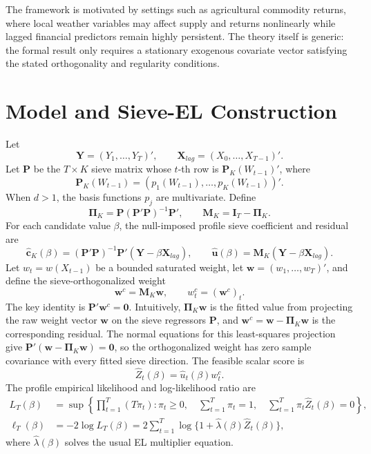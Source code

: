 \documentclass[11pt]{article}
\begin{document}
The framework is motivated by settings such as agricultural commodity returns, where local weather variables may affect supply and returns nonlinearly while lagged financial predictors remain highly persistent. The theory itself is generic: the formal result only requires a stationary exogenous covariate vector satisfying the stated orthogonality and regularity conditions.

\section{Model and Sieve-EL Construction}

Let
\[
    \bm Y=(Y_1,\ldots,Y_T)',\qquad
    \bm X_{lag}=(X_0,\ldots,X_{T-1})'.
\]
Let \(\bm P\) be the \(T\times K\) sieve matrix whose \(t\)-th row is \(\bm P_K(W_{t-1})'\), where
\[
    \bm P_K(W_{t-1})=(p_1(W_{t-1}),\ldots,p_K(W_{t-1}))'.
\]
When \(d>1\), the basis functions \(p_j\) are multivariate. Define
\[
    \bm\Pi_K=\bm P(\bm P'\bm P)^{-1}\bm P',
    \qquad
    \bm M_K=\bm I_T-\bm\Pi_K.
\]
For each candidate value \(\beta\), the null-imposed profile sieve coefficient and residual are
\begin{equation}
    \widehat{\bm c}_K(\beta)
    =(\bm P'\bm P)^{-1}\bm P'(\bm Y-\beta\bm X_{lag}),
    \qquad
    \widehat{\bm u}(\beta)=\bm M_K(\bm Y-\beta\bm X_{lag}).
    \label{eq:paper-profile-sieve}
\end{equation}
Let \(w_t=w(X_{t-1})\) be a bounded saturated weight, let \(\bm w=(w_1,\ldots,w_T)'\), and define the sieve-orthogonalized weight
\begin{equation}
    \bm w^c=\bm M_K\bm w,
    \qquad
    w_t^c=(\bm w^c)_t.
    \label{eq:paper-weight}
\end{equation}
The key identity is \(\bm P'\bm w^c=\bm0\). Intuitively, \(\bm\Pi_K\bm w\) is the fitted value from projecting the raw weight vector \(\bm w\) on the sieve regressors \(\bm P\), and \(\bm w^c=\bm w-\bm\Pi_K\bm w\) is the corresponding residual. The normal equations for this least-squares projection give \(\bm P'(\bm w-\bm\Pi_K\bm w)=\bm0\), so the orthogonalized weight has zero sample covariance with every fitted sieve direction. The feasible scalar score is
\begin{equation}
    \widehat Z_t(\beta)=\widehat u_t(\beta)w_t^c.
    \label{eq:paper-score}
\end{equation}
The profile empirical likelihood and log-likelihood ratio are
\begin{align}
    L_T(\beta)
    &=\sup\left\{
       \prod_{t=1}^T(T\pi_t):
       \pi_t\geq0,\quad
       \sum_{t=1}^T\pi_t=1,\quad
       \sum_{t=1}^T\pi_t\widehat Z_t(\beta)=0
       \right\},                                                    \label{eq:paper-el}\\
    \ell_T(\beta)
    &=-2\log L_T(\beta)
      =2\sum_{t=1}^T\log\{1+\widehat\lambda(\beta)\widehat Z_t(\beta)\},
      \label{eq:paper-elr}
\end{align}
where \(\widehat\lambda(\beta)\) solves the usual EL multiplier equation.
\end{document}

